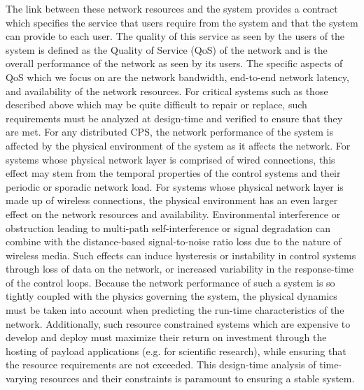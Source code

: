 The link between these network resources and the system provides a
contract which specifies the service that users require from the
system and that the system can provide to each user.  The quality of
this service as seen by the users of the system is defined as the
Quality of Service (QoS) of the network and is the overall performance
of the network as seen by its users.  The specific aspects of QoS
which we focus on are the network bandwidth, end-to-end network
latency, and availability of the network resources.  For critical
systems such as those described above which may be quite difficult to
repair or replace, such requirements must be analyzed at design-time
and verified to ensure that they are met.  For any distributed CPS,
the network performance of the system is affected by the physical
environment of the system as it affects the network.  For systems
whose physical network layer is comprised of wired connections, this
effect may stem from the temporal properties of the control systems
and their periodic or sporadic network load.  For systems whose
physical network layer is made up of wireless connections, the
physical environment has an even larger effect on the network
resources and availability.  Environmental interference or obstruction
leading to multi-path self-interference or signal degradation can
combine with the distance-based signal-to-noise ratio loss due to the
nature of wireless media.  Such effects can induce hysteresis or
instability in control systems through loss of data on the network, or
increased variability in the response-time of the control loops.
Because the network performance of such a system is so tightly coupled
with the physics governing the system, the physical dynamics must be
taken into account when predicting the run-time characteristics of the
network.  Additionally, such resource constrained systems which are
expensive to develop and deploy must maximize their return on
investment through the hosting of payload applications (e.g. for
scientific research), while ensuring that the resource requirements
are not exceeded.  This design-time analysis of time-varying resources
and their constraints is paramount to ensuring a stable system.


